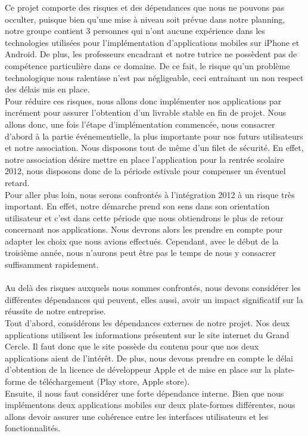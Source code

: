 \documentclass[a4paper,11px]{article}
\begin{document}
\indent \indent Ce projet comporte des risques et des dépendances que nous ne pouvons pas occulter, puisque bien qu’une mise à niveau soit prévue dans notre planning, notre groupe contient 3 personnes qui n’ont aucune expérience dans les technologies utilisées pour l’implémentation d’applications mobiles sur iPhone et Android. De plus, les professeurs encadrant et notre tutrice ne possèdent pas de compétence particulière dans ce domaine. De ce fait, le risque qu’un problème technologique nous ralentisse n'est pas négligeable, ceci entrainant un non respect des délais mis en place.\\
\indent Pour réduire ces risques, nous allons donc implémenter nos applications par incrément pour assurer l’obtention d’un livrable stable en fin de projet. Nous allons donc, une fois l’étape d’implémentation commencée, nous consacrer d’abord à la partie événementielle, la plus importante pour nos futurs utilisateurs et notre association. Nous disposons tout de même d’un filet de sécurité. En effet, notre association désire mettre en place l’application pour la rentrée scolaire 2012, nous disposons donc de la période estivale pour compenser un éventuel retard.\\
\indent Pour aller plus loin, nous serons confrontés à l’intégration 2012 à un risque très important. En effet, notre démarche prend son sens dans son orientation utilisateur et c’est dans cette période que nous obtiendrons le plus de retour concernant nos applications. Nous devrons alors les prendre en compte pour adapter les choix que nous avions effectués. Cependant, avec le début de la troisième année, nous n’aurons peut être pas le temps de nous y consacrer suffisamment rapidement.\\
\\
\indent Au delà des risques auxquels nous sommes confrontés, nous devons considérer les différentes dépendances qui peuvent, elles aussi, avoir un impact significatif sur la réussite de notre entreprise.\\
\indent Tout d’abord, considérons les dépendances externes de notre projet. Nos deux applications utilisent les informations présentent sur le site internet du Grand Cercle. Il faut donc que le site possède du contenu pour que nos deux applications aient de l’intérêt. De plus, nous devons prendre en compte le délai d’obtention de la licence de développeur Apple et de mise en place sur la plate-forme de téléchargement (Play store, Apple store).\\
\indent Ensuite, il nous faut  considérer une forte dépendance interne. Bien que nous implémentons deux applications mobiles sur deux plate-formes différentes, nous allons devoir assurer une cohérence entre les interfaces utilisateurs et les fonctionnalités.\\
\end{document}
